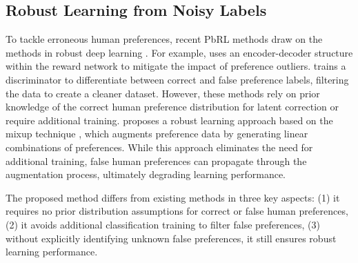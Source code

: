 \vspace{-5pt}
\subsection{Robust Learning from Noisy Labels}
\vspace{-5pt}

To tackle erroneous human preferences, recent PbRL methods draw on the methods in robust deep learning \cite{yao2018deep,lee2019robust,lukasik2020does,zhang2017mixup,amid2019robust,ma2020normalized,jiang2018mentornet,zhou2020robust}. For example, \cite{xue2023reinforcement} uses an encoder-decoder structure within the reward network to mitigate the impact of preference outliers. \cite{cheng2024rime} trains a discriminator to differentiate between correct and false preference labels, filtering the data to create a cleaner dataset. However, these methods rely on prior knowledge of the correct human preference distribution for latent correction or require additional training.  \cite{heo2025mixing} proposes a robust learning approach based on the mixup technique \cite{zhang2017mixup}, which augments preference data by generating linear combinations of preferences. While this approach eliminates the need for additional training, false human preferences can propagate through the augmentation process, ultimately degrading learning performance. 

The proposed method differs from existing methods in three key aspects: (1) it requires no prior distribution assumptions for correct or false human preferences, (2) it avoids additional classification training to filter false preferences, (3) without explicitly identifying unknown false preferences, it still ensures robust learning performance.

\vspace{-5pt}
